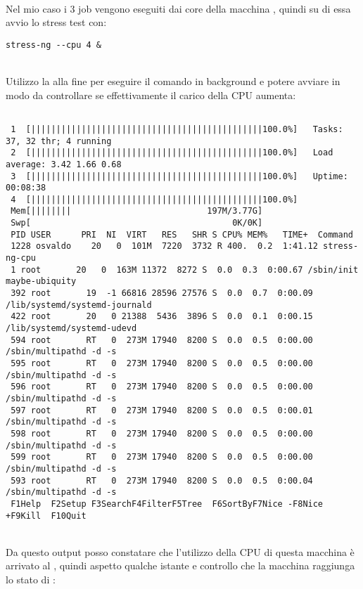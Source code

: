 \ \\
Nel mio caso i 3 job vengono eseguiti dai core  della macchina , quindi su di essa avvio lo stress test con:

\begin{lstlisting}[style=cmd]
 stress-ng --cpu 4 &
\end{lstlisting}
\ \\
Utilizzo la \icode{\&} alla fine per eseguire il comando in background e potere avviare  in modo da controllare se effettivamente il carico della CPU aumenta:

\begin{lstlisting}[style=output_tiny]
                                                                                 
 1  [||||||||||||||||||||||||||||||||||||||||||||||100.0%]   Tasks: 37, 32 thr; 4 running
 2  [||||||||||||||||||||||||||||||||||||||||||||||100.0%]   Load average: 3.42 1.66 0.68 
 3  [||||||||||||||||||||||||||||||||||||||||||||||100.0%]   Uptime: 00:08:38          
 4  [||||||||||||||||||||||||||||||||||||||||||||||100.0%]                             
 Mem[||||||||                           197M/3.77G]                             
 Swp[                                        0K/0K]                             
 PID USER      PRI  NI  VIRT   RES   SHR S CPU% MEM%   TIME+  Command        
 1228 osvaldo    20   0  101M  7220  3732 R 400.  0.2  1:41.12 stress-ng-cpu  
 1 root       20   0  163M 11372  8272 S  0.0  0.3  0:00.67 /sbin/init maybe-ubiquity
 392 root       19  -1 66816 28596 27576 S  0.0  0.7  0:00.09 /lib/systemd/systemd-journald
 422 root       20   0 21388  5436  3896 S  0.0  0.1  0:00.15 /lib/systemd/systemd-udevd
 594 root       RT   0  273M 17940  8200 S  0.0  0.5  0:00.00 /sbin/multipathd -d -s
 595 root       RT   0  273M 17940  8200 S  0.0  0.5  0:00.00 /sbin/multipathd -d -s
 596 root       RT   0  273M 17940  8200 S  0.0  0.5  0:00.00 /sbin/multipathd -d -s
 597 root       RT   0  273M 17940  8200 S  0.0  0.5  0:00.01 /sbin/multipathd -d -s
 598 root       RT   0  273M 17940  8200 S  0.0  0.5  0:00.00 /sbin/multipathd -d -s
 599 root       RT   0  273M 17940  8200 S  0.0  0.5  0:00.00 /sbin/multipathd -d -s
 593 root       RT   0  273M 17940  8200 S  0.0  0.5  0:00.04 /sbin/multipathd -d -s
 F1Help  F2Setup F3SearchF4FilterF5Tree  F6SortByF7Nice -F8Nice +F9Kill  F10Quit 
\end{lstlisting}
\ \\
Da questo output posso constatare che l'utilizzo della CPU di questa macchina \`{e} arrivato al , quindi aspetto qualche istante e controllo che la macchina raggiunga lo stato di :

